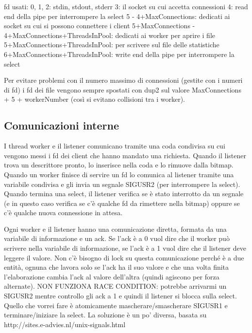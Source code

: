 \documentclass[a4paper]{article}
\theoremstyle{theorem}
\theoremstyle{remark}
\theoremstyle{definition}
\theoremstyle{corollary}
\theoremstyle{lemma}
\begin{document}
fd usati:
0, 1, 2: stdin, stdout, stderr
3: il socket su cui accetta connessioni
4: read end della pipe per interrompere la select
5 - 4+MaxConnections: dedicati ai socket su cui si possono connettere i client
5+MaxConnections - 4+MaxConnections+ThreadsInPool: dedicati ai worker per aprire
i file
5+MaxConnections+ThreadsInPool: per scrivere sul file delle statistiche
6+MaxConnections+ThreadsInPool: write end della pipe per interrompere la select

Per evitare problemi con il numero massimo di connessioni (gestite
con i numeri di fd) i fd dei file vengono sempre spostati con dup2 sul valore
MaxConnections + 5 + workerNumber (così si evitano collisioni tra i worker).

\subsection{Comunicazioni interne}
I thread worker e il listener comunicano tramite una coda condivisa su cui
vengono messi i fd dei client che hanno mandato una richiesta. Quando il listener
trova un descrittore pronto, lo inserisce nella coda e lo rimuove dalla bitmap.
Quando un worker finisce di servire un fd lo comunica al listener tramite una
variabile condivisa e gli invia un segnale SIGUSR2 (per interrompere la select).
Quando termina una select, il listener verifica se è stato interrotto da un segnale
(e in questo caso verifica se c'è qualche fd da rimettere nella bitmap) oppure
se c'è qualche nuova connessione in attesa.

Ogni worker e il listener hanno una comunicazione diretta, formata da una
variabile di informazione e un ack. Se l'ack è a 0 vuol dire che il worker può
scrivere nella variabile di informazione, se l'ack è a 1 vuol dire che il
listener deve leggere il valore. Non c'è bisogno di lock su questa comunicazione
perché è a due entità, ognuna che lavora solo se l'ack ha il suo valore e che
una volta finita l'elaborazione cambia l'ack al valore dell'altra (quindi
agiscono per forza alternate).
NON FUNZIONA RACE CONDITION: potrebbe arrivarmi un SIGUSR2 mentre controllo gli
ack a 1 e quindi il listener si blocca sulla select. Quello che vorrei fare è
atomicamente mascherare/smascherare SIGUSR1 e terminare/iniziare la select. La
soluzione è un po' diversa, basata su http://sites.e-advies.nl/unix-signals.html
\end{document}
